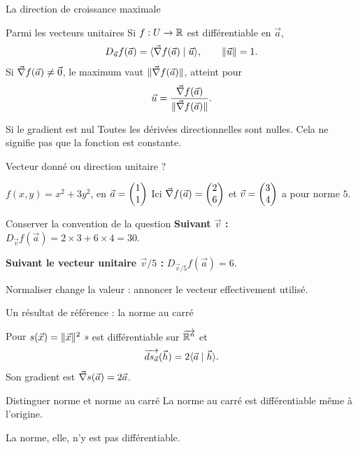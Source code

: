 \begin{frame}[t]{La direction de croissance maximale}
\coursanalyse
\begin{theoreme}{Parmi les vecteurs unitaires}
Si $f:U\to\mathbb R$ est différentiable en $\vec a$,
\[D_{\vec u}f(\vec a)=\langle \vec\nabla f(\vec a)\mid \vec u\rangle,\qquad\lVert \vec u\rVert=1.\]
Si $\vec\nabla f(\vec a)\ne\vec 0$, le maximum vaut $\lVert \vec\nabla f(\vec a)\rVert$, atteint pour
\[\vec u=\frac{\vec\nabla f(\vec a)}{\lVert \vec\nabla f(\vec a)\rVert}.\]
\end{theoreme}
\begin{resultat}{Si le gradient est nul}
Toutes les dérivées directionnelles sont nulles. Cela ne signifie pas que la fonction est constante.
\end{resultat}
\end{frame}

\begin{frame}[t]{Vecteur donné ou direction unitaire ?}
\coursanalyse
\begin{exemple}{$f(x,y)=x^2+3y^2$, en $\vec a=\begin{pmatrix}1\\1\end{pmatrix}$}
Ici $\vec\nabla f(\vec a)=\begin{pmatrix}2\\6\end{pmatrix}$ et $\vec v=\begin{pmatrix}3\\4\end{pmatrix}$ a pour norme $5$.
\end{exemple}
\begin{resultat}{Conserver la convention de la question}
\textbf{Suivant $\vec v$ :} $D_{\vec v}f(\vec a)=2\times3+6\times4=30$.

\medskip
\textbf{Suivant le vecteur unitaire $\vec v/5$ :} $D_{\vec v/5}f(\vec a)=6$.
\end{resultat}
\vfill Normaliser change la valeur : annoncer le vecteur effectivement utilisé.
\end{frame}

\begin{frame}[t]{Un résultat de référence : la norme au carré}
\coursanalyse
\begin{theoreme}{Pour $s(\vec x)=\lVert \vec x\rVert^2$}
$s$ est différentiable sur $\overrightarrow{\mathbb R^{n}}$ et
\[\overrightarrow{ds_{\vec a}}(\vec h)=2\langle \vec a\mid \vec h\rangle.\]
Son gradient est $\vec\nabla s(\vec a)=2\vec a$.
\end{theoreme}
\begin{resultat}{Distinguer norme et norme au carré}
La norme au carré est différentiable même à l'origine.

\medskip
La norme, elle, n'y est pas différentiable.
\end{resultat}
\end{frame}

